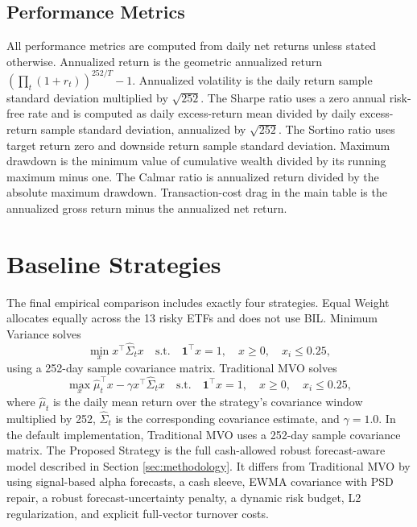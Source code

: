 \documentclass[11pt]{article}
\begin{document}
\subsection{Performance Metrics}

All performance metrics are computed from daily net returns unless stated otherwise.
Annualized return is the geometric annualized return
\((\prod_t(1+r_t))^{252/T}-1\). Annualized volatility is the daily return sample
standard deviation multiplied by \(\sqrt{252}\). The Sharpe ratio uses a zero
annual risk-free rate and is computed as daily excess-return mean divided by daily
excess-return sample standard deviation, annualized by \(\sqrt{252}\). The Sortino
ratio uses target return zero and downside return sample standard deviation.
Maximum drawdown is the minimum value of cumulative wealth divided by its running
maximum minus one. The Calmar ratio is annualized return divided by the absolute
maximum drawdown. Transaction-cost drag in the main table is the annualized gross
return minus the annualized net return.

\section{Baseline Strategies}
\label{sec:baselines}

The final empirical comparison includes exactly four strategies. Equal Weight
allocates equally across the 13 risky ETFs and does not use BIL. Minimum Variance
solves
\begin{equation}
\min_x x^\top\hat{\Sigma}_t x
\quad
\text{s.t.}\quad
\mathbf{1}^\top x=1,\quad x\ge0,\quad x_i\le0.25,
\end{equation}
using a 252-day sample covariance matrix. Traditional MVO solves
\begin{equation}
\max_x \hat{\mu}_t^\top x-\gamma x^\top\hat{\Sigma}_t x
\quad
\text{s.t.}\quad
\mathbf{1}^\top x=1,\quad x\ge0,\quad x_i\le0.25,
\end{equation}
where \(\hat{\mu}_t\) is the daily mean return over the strategy's covariance window
multiplied by 252, \(\hat{\Sigma}_t\) is the corresponding covariance estimate, and
\(\gamma=1.0\). In the default implementation, Traditional MVO uses a 252-day sample
covariance matrix. The Proposed Strategy is the full cash-allowed robust
forecast-aware model described in Section \ref{sec:methodology}. It differs from
Traditional MVO by using signal-based alpha forecasts, a cash sleeve, EWMA covariance
with PSD repair, a robust forecast-uncertainty penalty, a dynamic risk budget, L2
regularization, and explicit full-vector turnover costs.
\end{document}
